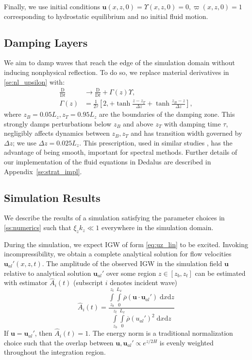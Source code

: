 \documentclass[
        fleqn,
        usenatbib,
    ]{mnras}
\newcommand*{\md}[2]{\frac{\mathrm{D}#1}{\mathrm{D}#2}}
\newcommand*{\p}[1]{\left(#1\right)}
\newcommand*{\s}[1]{\left[#1\right]}
\newcommand*{\bm}[1]{\boldsymbol{\mathbf{#1}}}
\begin{document}
Finally, we use initial conditions $\bm{u}(x, z, 0) = \Upsilon(x, z, 0) = 0,
\varpi(x, z, 0) = 1$ corresponding to hydrostatic equilibrium and no initial
fluid motion.

\subsection{Damping Layers}\label{ss:damping}

We aim to damp waves that reach the edge of the simulation domain without
inducing nonphysical reflection. To do so, we replace material derivatives
in \autoref{se:nl_upsilon} with:
\begin{align}
    \md{}{t} &\to \md{}{t} + \Gamma(z)\Upsilon,\nonumber\\
    \Gamma(z) &= \frac{1}{2\tau}\s{2,+ \tanh \frac{z - z_T}{\Delta z}
        + \tanh \frac{z_B - z}{\Delta z}},\label{eq:Gamma}
\end{align}
where $z_B = 0.05L_z, z_T = 0.95L_z$ are the boundaries of the damping zone.
This strongly damps perturbations below $z_B$ and above $z_T$ with damping time
$\tau$, negligibly affects dynamics between $z_B, z_T$ and has transition width
governed by $\Delta z$; we use $\Delta z = 0.025L_z$. This prescription, used in
similar studies \citep{lecoanet_damp}, has the advantage of being smooth,
important for spectral methods. Further details of our implementation of the
fluid equations in Dedalus are described in Appendix~\ref{se:strat_impl}.

\subsection{Simulation Results}\label{ss:lin_ns}

We describe the results of a simulation satisfying the parameter choices in
\autoref{ss:numerics} such that $\xi_z k_z \ll 1$ everywhere in the simulation
domain.

During the simulation, we expect IGW of form \autoref{eq:uz_lin} to be excited.
Invoking incompressibility, we obtain a complete analytical solution for flow
velocities $\bm{u}_{al}'(x, z, t)$. The amplitude of the observed IGW in the
simulation field $\bm{u}$ relative to analytical solution $\bm{u}_{al}'$ over
some region $z \in [z_b, z_t]$ can be estimated with estimator $\hat{A}_i(t)$
(subscript $i$ denotes incident wave)
\begin{equation}
    \hat{A}_i(t) = \frac{\int\limits_{z_b}^{z_t}\int\limits_0^{L_x}
        \overline{\rho}\p{\bm{u} \cdot \bm{u}_{al}'}\;\mathrm{d}x\mathrm{d}z}
        {\int\limits_{z_b}^{z_t}\int\limits_0^{L_x}
        \overline{\rho}\p{u_{al}'}^2\;\mathrm{d}x\mathrm{d}z}
        \label{eq:ahat_def}
\end{equation}
If $\bm{u} = \bm{u}_{al}'$, then $\hat{A}_i(t) = 1$. The energy norm is a
traditional normalization choice such that the overlap between $\bm{u},
\bm{u}_{al}' \propto e^{z/2H}$ is evenly weighted throughout the integration
region.
\end{document}
